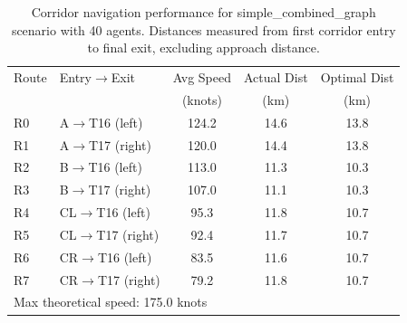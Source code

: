 \begin{table}[htbp]
\centering
\caption{Corridor navigation performance for simple\_combined\_graph scenario with 40 agents. Distances measured from first corridor entry to final exit, excluding approach distance.}
\label{table:route_speeds}
\begin{tabular}{llccc}
\hline
Route & Entry$\rightarrow$Exit & Avg Speed & Actual Dist & Optimal Dist \\
 & & (knots) & (km) & (km) \\
\hline
R0 & A$\rightarrow$T16 (left) & 124.2 & 14.6 & 13.8 \\
R1 & A$\rightarrow$T17 (right) & 120.0 & 14.4 & 13.8 \\
R2 & B$\rightarrow$T16 (left) & 113.0 & 11.3 & 10.3 \\
R3 & B$\rightarrow$T17 (right) & 107.0 & 11.1 & 10.3 \\
R4 & CL$\rightarrow$T16 (left) & 95.3 & 11.8 & 10.7 \\
R5 & CL$\rightarrow$T17 (right) & 92.4 & 11.7 & 10.7 \\
R6 & CR$\rightarrow$T16 (left) & 83.5 & 11.6 & 10.7 \\
R7 & CR$\rightarrow$T17 (right) & 79.2 & 11.8 & 10.7 \\
\hline
\multicolumn{5}{l}{\footnotesize Max theoretical speed: 175.0 knots} \\
\end{tabular}
\end{table}